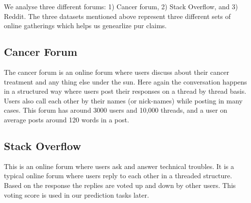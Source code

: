 We analyse three different forums: 1) Cancer forum, 2) Stack Overflow, and
3) Reddit.
The three datasets mentioned above represent three different sets of
online gatherings which helps us genearlize pur claims. 

\subsection{Cancer Forum}
The cancer forum is an online forum where users discuss about their cancer
treatment and any thing else under the sun. Here again the conversation happens
in a structured way where users post their responses on a thread by thread
basis. Users also call each other by their names (or nick-names) while posting
in many cases. This forum has around 3000 users and 10,000 threads, and a user
on average posts around 120 words in a post.

\subsection{Stack Overflow}
This is an online forum where users ask and answer technical troubles. It is a
typical online forum where users reply to each other in a threaded structure.
Based on the response the replies are voted up and down by other users. This
voting score is used in our prediction tasks later. 


